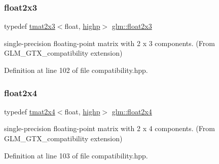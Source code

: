 \mbox{\label{group__gtx__compatibility_gad4078adf5ec44d1878c63bf2962fbe9e}} 
\subsubsection{\texorpdfstring{float2x3}{float2x3}}
{\footnotesize\ttfamily typedef \mbox{\hyperlink{structglm_1_1tmat2x3}{tmat2x3}}$<$float, \mbox{\hyperlink{namespaceglm_a0f04f086094c747d227af4425893f545ac6f7eab42eacbb10d59a58e95e362074}{highp}}$>$ \mbox{\hyperlink{group__gtx__compatibility_gad4078adf5ec44d1878c63bf2962fbe9e}{glm\+::float2x3}}}



single-\/precision floating-\/point matrix with 2 x 3 components. (From G\+L\+M\+\_\+\+G\+T\+X\+\_\+compatibility extension) 



Definition at line 102 of file compatibility.\+hpp.

\mbox{\label{group__gtx__compatibility_ga33955674c7eee16728dd45fc10dc9547}} 
\subsubsection{\texorpdfstring{float2x4}{float2x4}}
{\footnotesize\ttfamily typedef \mbox{\hyperlink{structglm_1_1tmat2x4}{tmat2x4}}$<$float, \mbox{\hyperlink{namespaceglm_a0f04f086094c747d227af4425893f545ac6f7eab42eacbb10d59a58e95e362074}{highp}}$>$ \mbox{\hyperlink{group__gtx__compatibility_ga33955674c7eee16728dd45fc10dc9547}{glm\+::float2x4}}}



single-\/precision floating-\/point matrix with 2 x 4 components. (From G\+L\+M\+\_\+\+G\+T\+X\+\_\+compatibility extension) 



Definition at line 103 of file compatibility.\+hpp.

\mbox{\label{group__gtx__compatibility_ga25f20d2c12f9b5f3917467e92899ea5a}} 
